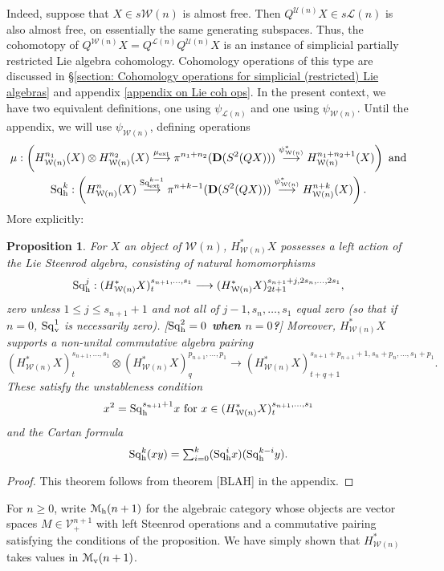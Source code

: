 \documentclass[11pt]{amsart}
\theoremstyle{plain}
\newtheorem{prop}[thm]{Proposition}
\theoremstyle{definition}
\renewcommand{\to}{\longrightarrow}
\newcommand{\calU}{\mathcal{U}}
\newcommand{\calL}{\mathcal{L}}
\newcommand{\calV}{\mathcal{V}}
\newcommand{\calw}{\mathcal{W}}
\newcommand{\calMv}{\mathcal{M}_\textup{v}}
\newcommand{\calMh}{\mathcal{M}_\textup{h}}
\theoremstyle{plain}
\newcommand{\vect}[2]{\calV^{#1}_{#2}}
\newcommand{\ExtCohOp}{\textup{Sq}_\textup{ext}}
\newcommand{\ExtCohProd}{\mu_\textup{ext}}
\newcommand{\Sqh}{\mathrm{Sq}_\textup{h}}
\newcommand{\Sqv}{\mathrm{Sq}_\textup{v}}
\newcommand{\dual}{\mathbf{D}}
\begin{document}
\begin{Cohomology Operations for W and U}
Indeed, suppose that $X\in s\calw(n)$ is almost free. Then $Q^{\calU(n)}X\in s\calL(n)$ is also almost free, on essentially the same generating subspaces. Thus, the cohomotopy of $Q^{\calw(n)}X=Q^{\calL(n)}Q^{\calU(n)}X$ is an instance of simplicial partially restricted Lie algebra cohomology. Cohomology operations of this type are discussed in \S\ref{section: Cohomology operations for simplicial (restricted) Lie algebras} and appendix \ref{appendix on Lie coh ops}. In the present context, we have two equivalent definitions, one using $\psi_{\calL(n)}$ and one using $\psi_{\calw(n)}$. Until the appendix, we will use $\psi_{\calw(n)}$, defining operations
\begin{gather*}
\mu:\left(H_{\calw(n)}^{n_1}(X)\otimes H_{\calw(n)}^{n_2}(X)\overset{\ExtCohProd}{\to} \pi^{n_1+n_2}(\dual(S^2(QX)))\overset{\psi_{\calw(n)}^*}{\to} H_{\calw(n)}^{n_1+n_2+1}(X)\right)\textup{ and}\\
\Sqh^k:\left(H_{\calw(n)}^{n}(X)\overset{\ExtCohOp^{k-1}}{\to} \pi^{n+k-1}(\dual(S^2(QX)))\overset{\psi_{\calw(n)}^*}{\to} H_{\calw(n)}^{n+k}(X)\right).
\end{gather*}
More explicitly:
\begin{prop}
For $X$ an object of $\calw(n)$, $H^*_{\calw(n)}X$ possesses a left action of the Lie Steenrod algebra, consisting of natural homomorphisms
\[\Sqh^j:(H^*_{\calw(n)}X)_t^{s_{n+1},\ldots,s_1}\to (H^*_{\calw(n)}X)_{2t+1}^{s_{n+1}+j,2s_{n},\ldots,2s_1},\]
zero unless $1\leq j\leq s_{n+1}+1$ and not all of $j-1,s_{n},\ldots,s_1$ equal zero (so that if $n=0$, $\Sqv^1$ is necessarily zero). %
[\textbf{$\Sqh^2=0$ when $n=0$?}] Moreover, $H^*_{\calw(n)}X$ supports a non-unital commutative algebra pairing
\[(H^*_{\calw(n)}X)_t^{s_{n+1},\ldots,s_1}\otimes (H^*_{\calw(n)}X)_q^{p_{n+1},\ldots,p_1}\to (H^*_{\calw(n)}X)_{t+q+1}^{s_{n+1}+p_{n+1}+1,s_{n}+p_{n},\ldots,s_1+p_1}.\]
These satisfy the unstableness condition
\[x^2=\Sqh^{s_{n+1}+1}x\text{ for }x\in (H^*_{\calw(n)}X)_t^{s_{n+1},\ldots,s_1}\]
and the Cartan formula
\[\Sqh^k(xy)=\textstyle\sum_{i=0}^k(\Sqh^ix)(\Sqh^{k-i}y).\]
\end{prop}
\begin{proof}
This theorem follows from theorem [BLAH] in the appendix.
\end{proof}
For $n\geq0$, write $\calMh(n+1)$ for the algebraic category whose objects are vector spaces $M\in\vect{n+1}{+}$ with left Steenrod operations and a commutative pairing satisfying the conditions of the proposition. We have simply shown that $H^*_{\calw(n)}$ takes values in $\calMv(n+1)$.


\end{Cohomology Operations for W and U}
\end{document}
